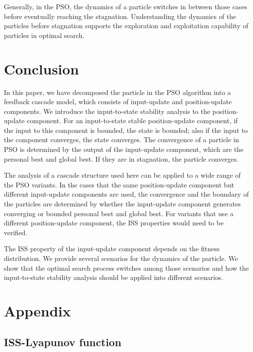 \documentclass{sig-alternate}
\begin{document}
Generally, in the PSO, the dynamics of a particle switches in between those cases before eventually reaching the stagnation.
Understanding the dynamics of the particles before stagnation supports the exploration and exploitation capability of particles in optimal search.

\section{Conclusion}
\label{sec:conclusion}

In this paper, we have decomposed the particle in the PSO algorithm into a feedback cascade model, which consists of input-update and position-update components.
We introduce the input-to-state stability analysis to the position-update component.
For an input-to-state stable position-update component, if the input to this component is bounded, the state is bounded; also if the input to the component converges, the state converges.
The convergence of a particle in PSO is determined by the output of the input-update component, which are the personal best and global best.
If they are in stagnation, the particle converges.

The analysis of a cascade structure used here can be applied to a wide range of the PSO variants.
In the cases that the same position-update component but different input-update components are used, the convergence and the boundary of the particles are determined by whether the input-update component generates converging or bounded personal best and global best.
For variants that use a different position-update component, the ISS properties would need to be verified.

The ISS property of the input-update component depends on the fitness distribution.
We provide several scenarios for the dynamics of the particle.
We show that the optimal search process switches among those scenarios and how the input-to-state stability analysis should be applied into different scenarios.

\section*{Appendix}
\label{sec:appendix}

\subsection{ISS-Lyapunov function}
\label{sec:iss_lyapunov:func}
\end{document}
